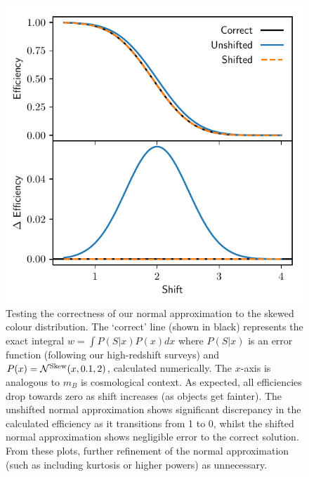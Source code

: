 \documentclass[a4paper,fleqn,usenatbib]{mnras}
\begin{document}
\begin{figure}
	\begin{center}
		\includegraphics[width=\columnwidth]{shift.pdf}
	\end{center}
	\caption{Testing the correctness of our normal approximation to the skewed colour distribution. The `correct' line (shown in black) represents the exact integral $w = \int P(S|x) P(x) dx$ where $P(S|x)$ is an error function (following our high-redshift surveys) and $P(x) = \mathcal{N}^{\rm Skew}(x, 0.1, 2)$, calculated numerically. The $x$-axis is analogous to $m_B$ is cosmological context. As expected, all efficiencies drop towards zero as shift increases (as objects get fainter). The unshifted normal approximation shows significant discrepancy in the calculated efficiency as it transitions from 1 to 0, whilst the shifted normal approximation shows negligible error to the correct solution. From these plots, further refinement of the normal approximation (such as including kurtosis or higher powers) as unnecessary.}
	\label{fig:shift}
\end{figure}
\end{document}
